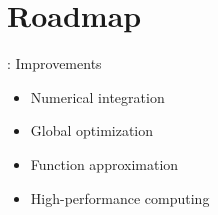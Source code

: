 \section{Roadmap}
\begin{frame}{\insertsection: Improvements}

\begin{itemize}
\item Numerical integration
\item Global optimization
\item Function approximation
\item High-performance computing
\end{itemize}
\end{frame}
